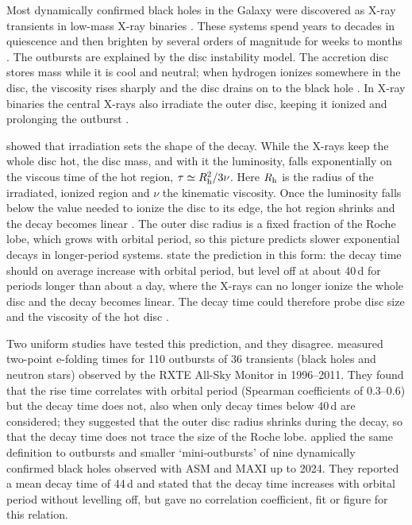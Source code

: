 \documentclass[fleqn,usenatbib]{mnras}
\begin{document}
Most dynamically confirmed black holes in the Galaxy were discovered as X-ray transients in low-mass X-ray binaries \citep{CorralSantana2016}. These systems spend years to decades in quiescence and then brighten by several orders of magnitude for weeks to months \citep{Tetarenko2016}. The outbursts are explained by the disc instability model. The accretion disc stores mass while it is cool and neutral; when hydrogen ionizes somewhere in the disc, the viscosity rises sharply and the disc drains on to the black hole \citep{Lasota2001,Hameury2020}. In X-ray binaries the central X-rays also irradiate the outer disc, keeping it ionized and prolonging the outburst \citep{KingRitter1998,Dubus2001}.

\citet{KingRitter1998} showed that irradiation sets the shape of the decay. While the X-rays keep the whole disc hot, the disc mass, and with it the luminosity, falls exponentially on the viscous time of the hot region, $\tau\simeq R_{\rm h}^2/3\nu$. Here $R_{\rm h}$ is the radius of the irradiated, ionized region and $\nu$ the kinematic viscosity. Once the luminosity falls below the value needed to ionize the disc to its edge, the hot region shrinks and the decay becomes linear \citep{KingRitter1998,Shahbaz1998}. The outer disc radius is a fixed fraction of the Roche lobe, which grows with orbital period, so this picture predicts slower exponential decays in longer-period systems. \citet{KingRitter1998} state the prediction in this form: the decay time should on average increase with orbital period, but level off at about 40\,d for periods longer than about a day, where the X-rays can no longer ionize the whole disc and the decay becomes linear. The decay time could therefore probe disc size and the viscosity of the hot disc \citep{Tetarenko2018a,Tetarenko2018b}.

Two uniform studies have tested this prediction, and they disagree. \citet{YanYu2015} measured two-point e-folding times for 110 outbursts of 36 transients (black holes and neutron stars) observed by the RXTE All-Sky Monitor \citep[ASM;][]{Levine1996} in 1996--2011. They found that the rise time correlates with orbital period (Spearman coefficients of 0.3--0.6) but the decay time does not, also when only decay times below 40\,d are considered; they suggested that the outer disc radius shrinks during the decay, so that the decay time does not trace the size of the Roche lobe. \citet{Saraswati2025} applied the same definition to outbursts and smaller `mini-outbursts' of nine dynamically confirmed black holes observed with ASM and MAXI up to 2024. They reported a mean decay time of 44\,d and stated that the decay time increases with orbital period without levelling off, but gave no correlation coefficient, fit or figure for this relation.
\end{document}
